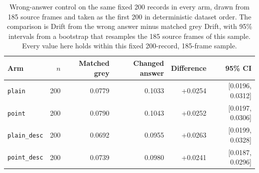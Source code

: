 \begin{table}[ht]
\centering
\caption[Matched wrong-answer control]{Wrong-answer control on the
same fixed 200 records in every arm, drawn from 185 source frames and taken as
the first 200 in deterministic dataset order. The comparison is Drift from the
wrong answer minus matched grey Drift, with 95\% intervals from a bootstrap
that resamples the 185 source frames of this sample. Every value here holds
within this fixed 200-record, 185-frame sample.}
\label{tab:rq2-known-change}
\begin{tabular}{lrrrrr}
\toprule
Arm & $n$ & Matched grey & Changed answer & Difference & 95\% CI \\
\midrule
\texttt{plain} & 200 & 0.0779 & 0.1033 & +0.0254 & [0.0196, 0.0312] \\
\texttt{point} & 200 & 0.0790 & 0.1043 & +0.0252 & [0.0197, 0.0306] \\
\texttt{plain\_desc} & 200 & 0.0692 & 0.0955 & +0.0263 & [0.0199, 0.0328] \\
\texttt{point\_desc} & 200 & 0.0739 & 0.0980 & +0.0241 & [0.0187, 0.0296] \\
\bottomrule
\end{tabular}
\end{table}
